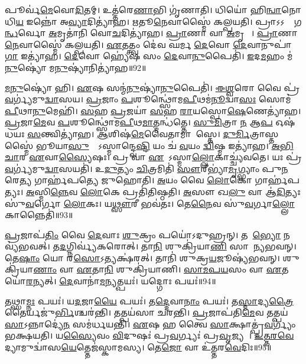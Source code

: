 𑌪𑍂𑌰𑍍𑌵॑\ul{𑌮𑍇}𑌵𑍋\ul{𑌦𑌿}𑌤𑌮𑍍। 
𑌉𑌤𑍍𑌤॑𑌰𑍇\ul{𑌣𑌾}𑌭𑌿 𑌗𑍃॑𑌣𑌾𑌤𑌿। 
𑌧𑌿𑌯𑍋॑ 𑌹𑌿\ul{𑌨𑍍𑌵𑌾}𑌨𑍋 𑌧𑌿\ul{𑌯} 𑌇𑌨𑍍𑌨𑍋॑ 𑌅\ul{𑌵𑍍𑌯𑌾}𑌦𑌿𑌤𑍍𑌯𑌾॑𑌹। 
\ul{𑌋}𑌤𑍂\ul{𑌨𑍇}𑌵𑌾𑌸𑍍𑌮𑍈॑ 𑌕𑌲𑍍𑌪𑌯𑌤𑌿। 
𑌪𑍍𑌰𑌾𑌽𑌽𑌸𑌾𑌂᳚ 𑌗\ul{𑌨𑍍𑌧}𑌰𑍍𑌵𑍋 \ul{𑌅}𑌮𑍃𑌤𑌾॑𑌨𑌿 𑌵𑍋\ul{𑌚}𑌦𑌿𑌤𑍍𑌯𑌾॑𑌹। 
\ul{𑌪𑍍𑌰𑌾}𑌣𑌾 𑌵𑌾 \ul{𑌅}𑌮𑍃𑌤𑌾𑌃᳚। 
\ul{𑌪𑍍𑌰𑌾}𑌣𑌾\ul{𑌨𑍇}𑌵𑌾𑌸𑍍𑌮𑍈॑ 𑌕𑌲𑍍𑌪𑌯𑌤𑌿। 
\ul{𑌏}𑌤𑌤𑍍𑌤𑍍𑌵𑌂 𑌦𑍇॑𑌵 𑌘𑌰𑍍𑌮 \ul{𑌦𑍇}𑌵𑍋 \ul{𑌦𑍇}𑌵𑌾𑌨𑍁𑌪𑌾॑\ul{𑌗𑌾} 𑌇𑌤𑍍𑌯𑌾॑𑌹। 
\ul{𑌦𑍇}𑌵𑍋 𑌹𑍍𑌯𑍇॑𑌷 𑌸𑌂 \ul{𑌦𑍇}𑌵𑌾\ul{𑌨𑍁}𑌪𑍈𑌤𑌿॑। 
\ul{𑌇}𑌦\ul{𑌮}𑌹𑌂 𑌮॑\ul{𑌨𑍁}𑌷𑍍𑌯𑍋॑ 𑌮\ul{𑌨𑍁}𑌷𑍍𑌯𑌾॑𑌨𑌿𑌤𑍍𑌯𑌾॑𑌹॥92॥

\ul{𑌮}\ul{𑌨𑍁}𑌷𑍍𑌯𑍋॑ 𑌹𑌿। 
\ul{𑌏}𑌷 𑌸𑌨𑍍𑌮॑\ul{𑌨𑍁}𑌷𑍍𑌯𑌾॑\ul{𑌨𑍁}𑌪𑍈𑌤𑌿॑। 
\ul{𑌈}\ul{𑌶𑍍𑌵}𑌰𑍋 𑌵𑍈 𑌪𑍍𑌰॑\ul{𑌵}𑌰𑍍𑌗𑍍𑌯॑𑌮𑍁\ul{𑌦𑍍𑌵𑌾}𑌸𑌯\sn{}। 
\ul{𑌪𑍍𑌰}𑌜𑌾𑌂 \ul{𑌪}𑌶𑍂𑌨𑍍𑌥𑍍𑌸𑍋॑𑌮\ul{𑌪𑍀}𑌥𑌮॑\ul{𑌨𑍂}𑌦𑍍𑌵𑌾\ul{𑌸𑌃} 𑌸𑍋𑌮॑ \ul{𑌪𑍀}𑌥𑌾\ul{𑌨𑍁}𑌮𑍇𑌹𑌿॑। 
\ul{𑌸}𑌹 \ul{𑌪𑍍𑌰}𑌜𑌯𑌾॑ \ul{𑌸}𑌹 \ul{𑌰𑌾}𑌯𑌸𑍍𑌪𑍋\ul{𑌷𑍇}𑌣𑍇𑌤𑍍𑌯𑌾॑𑌹। 
\ul{𑌪𑍍𑌰}𑌜𑌾\ul{𑌮𑍇}𑌵 \ul{𑌪}𑌶𑍂𑌨𑍍𑌥𑍍𑌸𑍋॑𑌮\ul{𑌪𑍀}𑌥\ul{𑌮𑌾}𑌤𑍍𑌮𑌨𑍍𑌧॑𑌤𑍍𑌤𑍇। 
\ul{𑌸𑍁}\ul{𑌮𑌿}𑌤𑍍𑌰𑌾 \ul{𑌨} 𑌆\ul{𑌪} 𑌓𑌷॑𑌧𑌯𑌃 \ul{𑌸}𑌨𑍍𑌤𑍍𑌵𑌿𑌤𑍍𑌯𑌾॑𑌹। 
\ul{𑌆}𑌶𑌿𑌷॑\ul{𑌮𑍇}𑌵𑍈𑌤𑌾𑌮𑌾𑌶𑌾᳚𑌸𑍍𑌤𑍇। 
\ul{𑌦𑍁}\ul{𑌰𑍍𑌮𑌿}𑌤𑍍𑌰𑌾𑌸𑍍𑌤𑌸𑍍𑌮𑍈॑ 𑌭𑍂𑌯𑌾\ul{𑌸𑍁}𑌰𑍍𑌯𑍋᳚𑌽𑌸𑍍𑌮𑌾𑌨𑍍𑌦𑍍𑌵𑍇\ul{𑌷𑍍𑌟𑌿} 𑌯𑌂 𑌚॑ \ul{𑌵}𑌯𑌂 \ul{𑌦𑍍𑌵𑌿}𑌷𑍍𑌮 𑌇𑌤𑍍𑌯𑌾॑𑌹। 
\ul{𑌅}\ul{𑌭𑌿}\ul{𑌚𑌾}𑌰 \ul{𑌏}𑌵𑌾\ul{𑌸𑍍𑌯𑍈}𑌷𑌃। 
𑌪𑍍𑌰 𑌵𑌾 \ul{𑌏}𑌷𑍋᳚𑌽𑌸𑍍𑌮𑌾\ul{𑌲𑍍𑌲𑍋}𑌕𑌾𑌚𑍍𑌚𑍍𑌯॑𑌵𑌤𑍇। 
𑌯𑌃 𑌪𑍍𑌰॑\ul{𑌵}𑌰𑍍𑌗𑍍𑌯॑𑌮𑍁\ul{𑌦𑍍𑌵𑌾}𑌸𑌯𑌤𑌿॑। 
𑌉\ul{𑌦𑍁}𑌤𑍍𑌯𑌂 \ul{𑌚𑌿}𑌤𑍍𑌰𑌮𑌿𑌤𑌿॑ \ul{𑌸𑍗}𑌰𑍀𑌭𑍍𑌯𑌾॑\ul{𑌮𑍃}𑌗𑍍𑌭𑍍𑌯𑌾𑌂 𑌪𑍁\ul{𑌨}𑌰𑍇\ul{𑌤𑍍𑌯} 𑌗𑌾𑌰𑍍\mbox{}𑌹॑𑌪𑌤𑍍𑌯𑍇 𑌜𑍁𑌹𑍋𑌤𑌿। 
\ul{𑌅}𑌯𑌂 𑌵𑍈 \ul{𑌲𑍋}𑌕𑍋 𑌗𑌾𑌰𑍍\mbox{}𑌹॑𑌪𑌤𑍍𑌯𑌃। 
\ul{𑌅}𑌸𑍍𑌮𑌿\ul{𑌨𑍍𑌨𑍇}𑌵 \ul{𑌲𑍋}𑌕𑍇 𑌪𑍍𑌰𑌤𑌿॑𑌤𑌿𑌷𑍍𑌠𑌤𑌿। 
\ul{𑌅}𑌸𑍗 𑌖\ul{𑌲𑍁} 𑌵𑌾 𑌆॑\ul{𑌦𑌿}𑌤𑍍𑌯𑌃 𑌸𑍁॑\ul{𑌵}𑌰𑍍𑌗𑍋 \ul{𑌲𑍋}𑌕𑌃। 
𑌯\ul{𑌥𑍍𑌸𑍗}𑌰𑍀 𑌭𑌵॑𑌤𑌃। 
𑌤𑍇\ul{𑌨𑍈}𑌵 𑌸𑍁॑\ul{𑌵}𑌰𑍍𑌗𑌾\ul{𑌲𑍍𑌲𑍋}𑌕𑌾𑌨𑍍𑌨𑍈𑌤𑌿॑॥93॥
\anuvakamend[𑌬𑍍𑌰𑌹𑍍𑌮॑𑌣𑌸𑍍𑌤𑍍𑌵𑌾 𑌪\ul{𑌰}𑌸𑍍𑌪𑌾\ul{𑌯𑌾} 𑌇𑌤𑍍𑌯𑌾॑𑌹 𑌦𑌧𑌾\ul{𑌤𑍍𑌯}𑌨𑍍𑌵𑌿𑌤𑍍𑌯॑ 𑌰\ul{𑌕𑍍𑌷}𑌸𑍍𑌵𑍀 𑌰𑌕𑍍𑌷॑\ul{𑌸𑌾}𑌮𑌪॑𑌹\ul{𑌤𑍍𑌯𑍈} 𑌵𑍈 𑌹𑌿𑌰॑𑌣𑍍𑌯𑌮𑌾𑌹𑌾𑌰𑍍𑌧𑌯\ul{𑌤𑌿} 𑌹𑍍𑌯𑍇॑𑌷 𑌗𑍃॑\ul{𑌣𑌾}𑌤𑍍𑌵𑌿𑌤𑍍𑌯𑌾॑𑌹 𑌮\ul{𑌨𑍁}𑌷𑍍𑌯𑌾॑𑌨𑌿𑌤𑍍𑌯𑌾॑𑌹𑌾\ul{𑌸𑍍𑌯𑍈}𑌷𑍋᳚𑌽𑌷𑍍𑌟𑍗 𑌚॑]

\ul{𑌪𑍍𑌰}𑌜𑌾𑌪॑\ul{𑌤𑌿𑌂} 𑌵𑍈 \ul{𑌦𑍇}𑌵𑌾𑌃  \ul{𑌶𑍁}𑌕𑍍𑌰𑌂 𑌪𑌯𑍋॑𑌽𑌦𑍁𑌹𑍍𑌰𑌨𑍍। 
𑌤𑌦𑍇᳚\ul{𑌭𑍍𑌯𑍋} 𑌨 𑌵𑍍𑌯॑𑌭𑌵𑌤𑍍। 
𑌤\ul{𑌦}𑌗𑍍𑌨𑌿𑌰𑍍𑌵𑍍𑌯॑𑌕𑌰𑍋𑌤𑍍। 
𑌤𑌾\ul{𑌨𑌿} 𑌶𑍁𑌕𑍍𑌰𑌿॑𑌯𑌾\ul{𑌣𑌿} 𑌸𑌾𑌮𑌾᳚𑌨𑍍𑌯𑌭𑌵𑌨𑍍। 
𑌤𑍇\ul{𑌷𑌾𑌂} 𑌯𑍋 𑌰\ul{𑌸𑍋}𑌽𑌤𑍍𑌯𑌕𑍍𑌷॑𑌰𑌤𑍍। 
𑌤𑌾𑌨𑌿॑ 𑌶𑍁𑌕𑍍𑌰\ul{𑌯}𑌜𑍂𑌷𑍍𑌯॑𑌭𑌵𑌨𑍍। 
𑌶𑍁𑌕𑍍𑌰𑌿॑𑌯𑌾\ul{𑌣𑌾𑌂} 𑌵𑌾 \ul{𑌏}𑌤𑌾\ul{𑌨𑌿} 𑌶𑍁𑌕𑍍𑌰𑌿॑𑌯𑌾𑌣𑌿। 
\ul{𑌸𑌾}\ul{𑌮}\ul{𑌪}\ul{𑌯}𑌸𑌂 𑌵𑌾 \ul{𑌏}𑌤𑌯𑍋॑\ul{𑌰}𑌨𑍍𑌯𑌤𑍍। 
\ul{𑌦𑍇}𑌵𑌾𑌨𑌾॑\ul{𑌮}𑌨𑍍𑌯𑌤𑍍𑌪𑌯𑌃॑। 
𑌯𑌦𑍍𑌗𑍋𑌃 𑌪𑌯𑌃॑॥94॥

𑌤𑌥𑍍𑌸𑌾\ul{𑌮𑍍𑌨𑌃} 𑌪𑌯𑌃॑। 
𑌯\ul{𑌦}𑌜𑌾\ul{𑌯𑍈} 𑌪𑌯𑌃॑। 
𑌤\ul{𑌦𑍍𑌦𑍇}𑌵𑌾\ul{𑌨𑌾𑌂} 𑌪𑌯𑌃॑। 
𑌤\ul{𑌸𑍍𑌮𑌾}𑌦𑍍𑌯\ul{𑌤𑍍𑌰𑍈}𑌤𑍈𑌰𑍍𑌯𑌜𑍁॑\ul{𑌰𑍍𑌭𑌿}\-𑌶𑍍𑌚𑌰॑𑌨𑍍𑌤𑌿। 
𑌤𑌤𑍍𑌪𑌯॑𑌸𑌾 𑌚𑌰𑌨𑍍𑌤𑌿। 
\ul{𑌪𑍍𑌰}𑌜𑌾𑌪॑𑌤𑌿\ul{𑌮𑍇}𑌵 𑌤𑌤𑍍𑌪𑌯॑\ul{𑌸𑌾}𑌽𑌨𑍍𑌨𑌾𑌦𑍍𑌯𑍇॑\ul{𑌨} 𑌸𑌮॑𑌰𑍍𑌧𑌯𑌨𑍍𑌤𑌿। 
\ul{𑌏}𑌷 𑌹 𑌤𑍍𑌵𑍈 \ul{𑌸𑌾}𑌕𑍍𑌷𑌾𑌤𑍍𑌪𑍍𑌰॑\ul{𑌵}𑌰𑍍𑌗𑍍𑌯𑌂॑ 𑌭𑌕𑍍𑌷𑌯𑌤𑌿। 
𑌯\ul{𑌸𑍍𑌯𑍈}𑌵𑌂  \ul{𑌵𑌿}𑌦𑍁𑌷𑌃॑ 𑌪𑍍𑌰\ul{𑌵}𑌰𑍍𑌗𑍍𑌯𑌃॑ 𑌪𑍍𑌰\ul{𑌵𑍃}𑌜𑍍𑌯𑌤𑍇᳚। 
\ul{𑌉}\ul{𑌤𑍍𑌤}\ul{𑌰}\ul{𑌵𑍇}𑌦𑍍𑌯𑌾𑌮𑍁𑌦𑍍𑌵𑌾॑𑌸\-\ul{𑌯𑍇}𑌤𑍍𑌤𑍇𑌜॑𑌸𑍍𑌕𑌾𑌮𑌸𑍍𑌯। 
𑌤𑍇\ul{𑌜𑍋} 𑌵𑌾 𑌉॑𑌤𑍍𑌤𑌰\ul{𑌵𑍇}𑌦𑌿𑌃॥95॥

